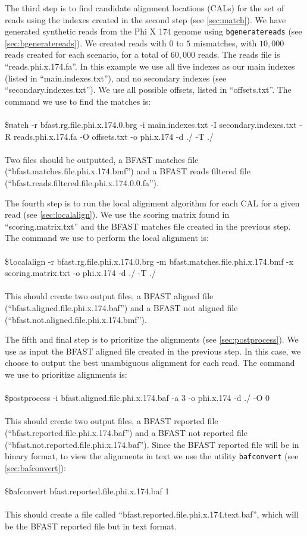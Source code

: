 \documentclass[a4paper,12pt]{book}
\newcommand{\TT}[1]{{\tt #1}} %
\newenvironment{script}{\\\\\footnotesize\$\TT}{\normalsize\\\\}
\newcommand{\BMF}{BFAST matches file} %
\newcommand{\BRFF}{BFAST reads filtered file} %
\newcommand{\BAF}{BFAST aligned file} %
\newcommand{\BNAF}{BFAST not aligned file} %
\newcommand{\BRF}{BFAST reported file} %
\newcommand{\BNRF}{BFAST not reported file} %
\begin{document}
The third step is to find candidate alignment locations (CALs) for the set of reads using the indexes created in the second step (see \autoref{sec:match}).
We have generated synthetic reads from the Phi X 174 genome using \TT{bgeneratereads} (see \autoref{sec:bgeneratereads}).
We created reads with $0$ to $5$ mismatches, with $10,000$ reads created for each scenario, for a total of $60,000$ reads.
The reads file is ``reads.phi.x.174.fa''.
In this example we use all five indexes as our main indexes (listed in ``main.indexes.txt''), and no secondary indexes (see ``secondary.indexes.txt'').
We use all possible offsets, listed in ``offsets.txt''.
The command we use to find the matches is:
\begin{script}
	match -r bfast.rg.file.phi.x.174.0.brg -i main.indexes.txt -I secondary.indexes.txt -R reads.phi.x.174.fa -O offsets.txt -o phi.x.174 -d ./ -T ./
\end{script}
Two files should be outputted, a \BMF{} (``bfast.matches.file.phi.x.174.bmf'') and a \BRFF{} (``bfast.reads.filtered.file.phi.x.174.0.0.fa'').

The fourth step is to run the local alignment algorithm for each CAL for a given read (see \autoref{sec:localalign}).
We use the scoring matrix found in ``scoring.matrix.txt'' and the \BMF{} created in the previous step.
The command we use to perform the local alignment is:
\begin{script}
	localalign -r bfast.rg.file.phi.x.174.0.brg -m bfast.matches.file.phi.x.174.bmf -x scoring.matrix.txt -o phi.x.174 -d ./ -T ./
\end{script}
This should create two output files, a \BAF{} (``bfast.aligned.file.phi.x.174.baf'') and a \BNAF{} (``bfast.not.aligned.file.phi.x.174.bmf'').

The fifth and final step is to prioritize the alignments (see \autoref{sec:postprocess}).
We use as input the \BAF{} created in the previous step.
In this case, we choose to output the best unambiguous alignment for each read.
The command we use to prioritize alignments is:
\begin{script}
	postprocess -i bfast.aligned.file.phi.x.174.baf -a 3 -o phi.x.174 -d ./ -O 0
\end{script}
This should create two output files, a \BRF{} (``bfast.reported.file.phi.x.174.baf'') and a \BNRF{} (``bfast.not.reported.file.phi.x.174.baf''). 
Since the \BRF{} will be in binary format, to view the alignments in text we use the utility \TT{bafconvert} (see \autoref{sec:bafconvert}):
\begin{script}
	bafconvert bfast.reported.file.phi.x.174.baf 1
\end{script}
This should create a file called ``bfast.reported.file.phi.x.174.text.baf'', which will be the \BRF{} but in text format. 
\end{document}

